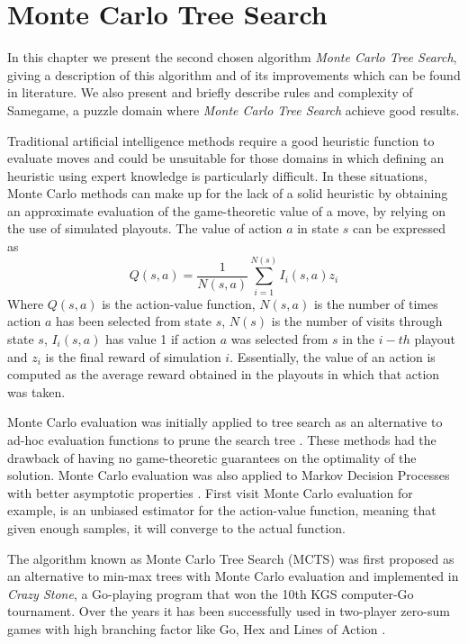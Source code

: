 \chapter{Monte Carlo Tree Search}
\label{MCTS}
In this chapter we present the second chosen algorithm \textit{Monte Carlo Tree Search}, giving a description of this algorithm and of its improvements which can be found in literature. We also present and briefly describe rules and complexity of Samegame, a puzzle domain where \textit{Monte Carlo Tree Search} achieve good results.

\medskip\noindent
Traditional artificial intelligence methods require a good heuristic function to evaluate moves and could be unsuitable for those domains in which defining an heuristic using expert knowledge is particularly difficult. In these situations, Monte Carlo methods can make up for the lack of a solid heuristic by obtaining an approximate evaluation of the game-theoretic value of a move, by relying on the use of simulated playouts. The value of action $a$ in state $s$ can be expressed as
\[Q(s,a) = \frac{1}{N(s,a)}\sum^{N(s)}_{i=1}I_i(s,a)z_i\]
Where $Q(s,a)$ is the action-value function, $N(s,a)$ is the number of times action $a$ has been selected from state $s$, $N(s)$ is the number of visits through state $s$, $I_i(s,a)$ has value 1 if action $a$ was selected from $s$ in the $i-th$ playout and $z_i$ is the final reward of simulation $i$. Essentially, the value of an action is computed as the average reward obtained in the playouts in which that action was taken.

\medskip\noindent
Monte Carlo evaluation was initially applied to tree search as an alternative to ad-hoc evaluation functions to prune the search tree \cite{10.1007/11674399_5} \cite{Juille99methodsfor}. These methods had the drawback of having no game-theoretic guarantees on the optimality of the solution.
Monte Carlo evaluation was also applied to Markov Decision Processes with better asymptotic properties \cite{doi:10.1287/opre.1040.0145} \cite{Bai:2015:OPL:2801030.2717316}. First visit Monte Carlo evaluation for example, is an unbiased estimator for the action-value function, meaning that given enough samples, it will converge to the actual function.

\medskip\noindent
The algorithm known as Monte Carlo Tree Search (MCTS) \cite{coulom:inria-00116992} was first proposed as an alternative to min-max trees with Monte Carlo evaluation and implemented in \textit{Crazy Stone}, a Go-playing program that won the 10th KGS computer-Go tournament. Over the years it has been successfully used in two-player zero-sum games with high branching factor like Go, Hex and Lines of Action \cite{gameExamples}.

